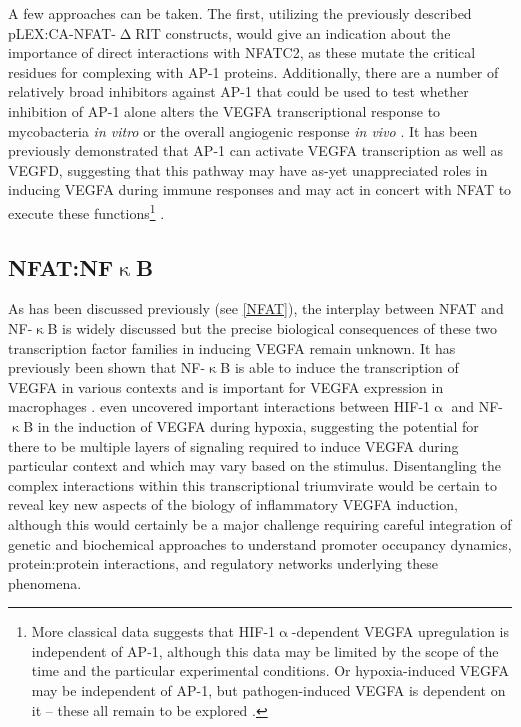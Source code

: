 A few approaches can be taken. The first, utilizing the previously described pLEX:CA\hyp{}NFAT\hyp{}$\upDelta$RIT constructs, would give an indication about the importance of direct interactions with NFATC2, as these mutate the critical residues for complexing with AP\hyp{}1 proteins. Additionally, there are a number of relatively broad inhibitors against AP\hyp{}1 that could be used to test whether inhibition of AP\hyp{}1 alone alters the VEGFA transcriptional response to mycobacteria \textit{in vitro} or the overall angiogenic response \textit{in vivo} \citep{Huang1997, Makino2017}. It has been previously demonstrated that AP\hyp{}1 can activate VEGFA transcription as well as VEGFD, suggesting that this pathway may have as\hyp{}yet unappreciated roles in inducing VEGFA during immune responses and may act in concert with NFAT to execute these functions\footnote{More classical data suggests that HIF\hyp{}1$\upalpha$\hyp{}dependent VEGFA upregulation is independent of AP\hyp{}1, although this data may be limited by the scope of the time and the particular experimental conditions. Or hypoxia\hyp{}induced VEGFA may be independent of AP\hyp{}1, but pathogen\hyp{}induced VEGFA is dependent on it -- these all remain to be explored \citep{Finkenzeller1995}.} \citep{Shih2001, Debinski2001, Josko2004, Wang2016, Guo2022}.

\subsection{NFAT:NF$\upkappa$B}\label{nfatnfkb}

As has been discussed previously (see \autoref{NFAT}), the interplay between NFAT and NF\hyp{}$\upkappa$B is widely discussed but the precise biological consequences of these two transcription factor families in inducing VEGFA remain unknown. It has previously been shown that NF\hyp{}$\upkappa$B is able to induce the transcription of VEGFA in various contexts \citep{Lukiw2003, Xie2010, Greenberger2010} and is important for VEGFA expression in macrophages \citep{Kiriakidis2003}. \citet{Lukiw2003} even uncovered important interactions between HIF\hyp{}1$\upalpha$ and NF\hyp{}$\upkappa$B in the induction of VEGFA during hypoxia, suggesting the potential for there to be multiple layers of signaling required to induce VEGFA during particular context and which may vary based on the stimulus. Disentangling the complex interactions within this transcriptional triumvirate would be certain to reveal key new aspects of the biology of inflammatory VEGFA induction, although this would certainly be a major challenge requiring careful integration of genetic and biochemical approaches to understand promoter occupancy dynamics, protein:protein interactions, and regulatory networks underlying these phenomena.

